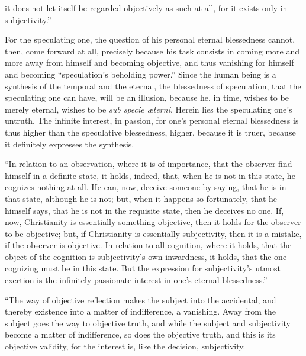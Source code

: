 \documentclass[12pt]{book}
\begin{document}
it does not let itself be regarded objectively as such at all, for it exists only in subjectivity.''

For the speculating one, the question of his personal eternal blessedness cannot, then, come forward at all, precisely because his task consists in coming more and more away from himself and becoming objective, and thus vanishing for himself and becoming ``speculation's beholding power.'' Since the human being is a synthesis of the temporal and the eternal, the blessedness of speculation, that the speculating one can have, will be an illusion, because he, in time, wishes to be merely eternal, wishes to be \textit{sub specie æterni}. Herein lies the speculating one's untruth. The infinite interest, in passion, for one's personal eternal blessedness is thus higher than the speculative blessedness, higher, because it is truer, because it definitely expresses the synthesis.

``In relation to an observation, where it is of importance, that the observer find himself in a definite state, it holds, indeed, that, when he is not in this state, he cognizes nothing at all. He can, now, deceive someone by saying, that he is in that state, although he is not; but, when it happens so fortunately, that he himself says, that he is not in the requisite state, then he deceives no one. If, now, Christianity is essentially something objective, then it holds for the observer to be objective; but, if Christianity is essentially subjectivity, then it is a mistake, if the observer is objective. In relation to all cognition, where it holds, that the object of the cognition is subjectivity's own inwardness, it holds, that the one cognizing must be in this state.
But the expression for subjectivity's utmost exertion is the infinitely passionate interest in one's eternal blessedness.''

``The way of objective reflection makes the subject into the accidental, and thereby existence into a matter of indifference, a vanishing. Away from the subject goes the way to objective truth, and while the subject and subjectivity become a matter of indifference, so does the objective truth, and this is its objective validity, for the interest is, like the decision, subjectivity.
\end{document}
